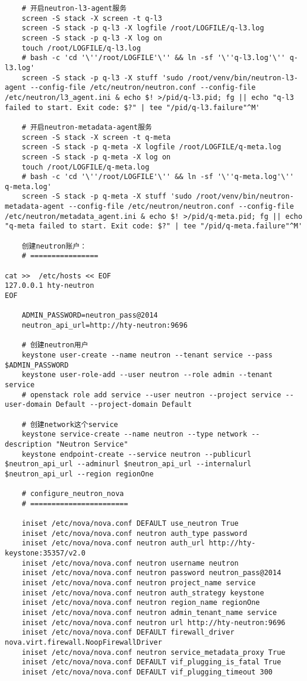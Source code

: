 \documentclass[a4paper,left=1.5cm,right=1.5cm,11pt]{article}
\begin{document}
\begin{lstlisting}
	# 开启neutron-l3-agent服务
	screen -S stack -X screen -t q-l3
	screen -S stack -p q-l3 -X logfile /root/LOGFILE/q-l3.log
    screen -S stack -p q-l3 -X log on
	touch /root/LOGFILE/q-l3.log
    # bash -c 'cd '\''/root/LOGFILE'\'' && ln -sf '\''q-l3.log'\'' q-l3.log'
	screen -S stack -p q-l3 -X stuff 'sudo /root/venv/bin/neutron-l3-agent --config-file /etc/neutron/neutron.conf --config-file /etc/neutron/l3_agent.ini & echo $! >/pid/q-l3.pid; fg || echo "q-l3 failed to start. Exit code: $?" | tee "/pid/q-l3.failure"^M'

	# 开启neutron-metadata-agent服务
	screen -S stack -X screen -t q-meta
	screen -S stack -p q-meta -X logfile /root/LOGFILE/q-meta.log
    screen -S stack -p q-meta -X log on
	touch /root/LOGFILE/q-meta.log
    # bash -c 'cd '\''/root/LOGFILE'\'' && ln -sf '\''q-meta.log'\'' q-meta.log'
	screen -S stack -p q-meta -X stuff 'sudo /root/venv/bin/neutron-metadata-agent --config-file /etc/neutron/neutron.conf --config-file /etc/neutron/metadata_agent.ini & echo $! >/pid/q-meta.pid; fg || echo "q-meta failed to start. Exit code: $?" | tee "/pid/q-meta.failure"^M'

	创建neutron账户：
	# ================

cat >>  /etc/hosts << EOF
127.0.0.1 hty-neutron
EOF

	ADMIN_PASSWORD=neutron_pass@2014
	neutron_api_url=http://hty-neutron:9696

	# 创建neutron用户
	keystone user-create --name neutron --tenant service --pass $ADMIN_PASSWORD
	keystone user-role-add --user neutron --role admin --tenant service
	# openstack role add service --user neutron --project service --user-domain Default --project-domain Default

	# 创建network这个service
	keystone service-create --name neutron --type network --description "Neutron Service"
	keystone endpoint-create --service neutron --publicurl $neutron_api_url --adminurl $neutron_api_url --internalurl $neutron_api_url --region regionOne

	# configure_neutron_nova
	# =======================

	iniset /etc/nova/nova.conf DEFAULT use_neutron True
	iniset /etc/nova/nova.conf neutron auth_type password
	iniset /etc/nova/nova.conf neutron auth_url http://hty-keystone:35357/v2.0
	iniset /etc/nova/nova.conf neutron username neutron
	iniset /etc/nova/nova.conf neutron password neutron_pass@2014
	iniset /etc/nova/nova.conf neutron project_name service
	iniset /etc/nova/nova.conf neutron auth_strategy keystone
	iniset /etc/nova/nova.conf neutron region_name regionOne
	iniset /etc/nova/nova.conf neutron admin_tenant_name service
	iniset /etc/nova/nova.conf neutron url http://hty-neutron:9696
	iniset /etc/nova/nova.conf DEFAULT firewall_driver nova.virt.firewall.NoopFirewallDriver
	iniset /etc/nova/nova.conf neutron service_metadata_proxy True
	iniset /etc/nova/nova.conf DEFAULT vif_plugging_is_fatal True
	iniset /etc/nova/nova.conf DEFAULT vif_plugging_timeout 300


\end{lstlisting}
\end{document}
